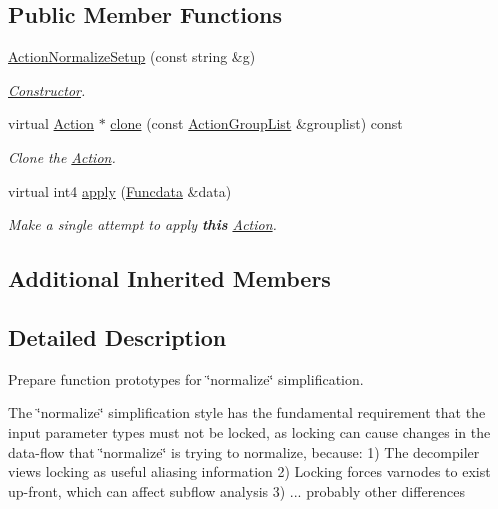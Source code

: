 \subsection*{Public Member Functions}
\begin{DoxyCompactItemize}
\item 
\mbox{\hyperlink{class_action_normalize_setup_a40f859f0483d8e1f4f22046a44067d52}{Action\+Normalize\+Setup}} (const string \&g)
\begin{DoxyCompactList}\small\item\em \mbox{\hyperlink{class_constructor}{Constructor}}. \end{DoxyCompactList}\item 
virtual \mbox{\hyperlink{class_action}{Action}} $\ast$ \mbox{\hyperlink{class_action_normalize_setup_a2c000f58b714f940cfab12142a0b294f}{clone}} (const \mbox{\hyperlink{class_action_group_list}{Action\+Group\+List}} \&grouplist) const
\begin{DoxyCompactList}\small\item\em Clone the \mbox{\hyperlink{class_action}{Action}}. \end{DoxyCompactList}\item 
virtual int4 \mbox{\hyperlink{class_action_normalize_setup_a399c4047a0cb042e54daba9d02e86b15}{apply}} (\mbox{\hyperlink{class_funcdata}{Funcdata}} \&data)
\begin{DoxyCompactList}\small\item\em Make a single attempt to apply {\bfseries{this}} \mbox{\hyperlink{class_action}{Action}}. \end{DoxyCompactList}\end{DoxyCompactItemize}
\subsection*{Additional Inherited Members}


\subsection{Detailed Description}
Prepare function prototypes for \char`\"{}normalize\char`\"{} simplification. 

The \char`\"{}normalize\char`\"{} simplification style has the fundamental requirement that the input parameter types must not be locked, as locking can cause changes in the data-\/flow that \char`\"{}normalize\char`\"{} is trying to normalize, because\+: 1) The decompiler views locking as useful aliasing information 2) Locking forces varnodes to exist up-\/front, which can affect subflow analysis 3) ... probably other differences

